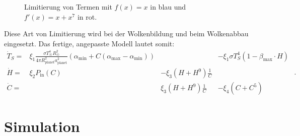 \begin{refsection}
\begin{figure}[!h]
	\caption{Limitierung von Termen mit $f(x) = x$ in blau und $f'(x) = x + x^7$ in rot.}
	\label{planeten:limit_graph}
\end{figure}
Diese Art von Limitierung wird bei der Wolkenbildung und beim Wolkenabbau eingesetzt. Das fertige, angepasste Modell lautet somit:
\begin{equation}
\begin{matrix}
\dot{T}_S = & \xi_1 \frac{\sigma T_{\astrosun}^4 R_{\astrosun}^2}{4 \pi R_{\text{planet}}^2 a_{\text{planet}}^2} (\alpha_{\text{min}} + C(\alpha_{\text{max}} - \alpha_{\text{min}})) && - \xi_1 \sigma T_{S}^4  (1 - \beta_{\text{max}} \cdot H)\\
\dot{H}   = & \xi_2 P_{\text{in}}(C) & - \xi_3 (H + H^9) \frac{1}{C}   &                   \\
\dot{C}   = &                        &   \xi_3 (H + H^9) \frac{1}{C}   & - \xi_4 (C + C^5)
\end{matrix} \text{ .}
\end{equation}

\section{Simulation}


\end{refsection}
